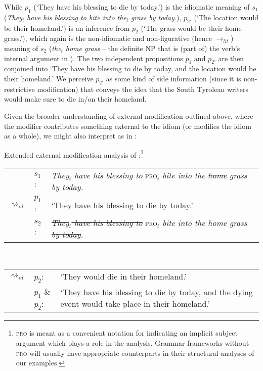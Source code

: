 \documentclass[output=paper]{langsci/langscibook}
\begin{document}
\noindent While $p_{1}$ (`They have his blessing to die by today.') is the idiomatic meaning of $s_{1}$ (\textit{They$_{i}$ have his blessing to bite into the$_{i}$ grass by today.}), $p_{2'}$ (`The location would be their homeland.') is an inference from $p_{2}$ (`The grass would be their home grass.'), which again is the non-idiomatic and non-figurative (hence $\rightarrow_{lit}$) meaning of $s_{2}$ (\textit{the$_{i}$ home grass} -- the definite NP that is (part of) the verb's internal argument in ). The two independent propositions $p_{1}$ and $p_{2'}$ are then conjoined into `They have his blessing to die by today, and the location would be their homeland.' We perceive $p_{2'}$ as some kind of side information (since it is non-restrictive modification) that conveys the idea that the South Tyrolean writers would make sure to die in/on their homeland.

Given the broader understanding of external modification outlined above, \linebreak where the modifier contributes something external to the idiom (or modifies the idiom as a whole), we might also interpret   as in :\largerpage 

\ea \label{analysis2 home grass} 
Extended external modification analysis of :\footnote{\textsc{pro} is meant as a convenient notation for indicating an implicit subject argument which plays a role in the analysis. Grammar frameworks without \textsc{pro} will usually have appropriate counterparts in their structural analyses of our examples.}\smallskip\\
\begin{tabularx}{\linewidth}[t]{@{}llQ@{}}
& 	$s_{1}$: & \textit{They$_{i}$ have his blessing to} \textsc{pro}$_{i}$ \textit{bite into the \sout{home} grass by today.} \\
$\rightsquigarrow_{id}$ &	$p_{1}$: & `They have his blessing to die by today.'\medskip\\
& 	$s_{2}$: & \textit{\sout{They$_{i}$ have his blessing to}} \textsc{pro}$_{i}$ \textit{bite into the home grass \sout{by today}.} \\
\end{tabularx}\\\begin{tabularx}{\linewidth}[t]{@{}llQ@{}}
$\rightsquigarrow_{id}$	&	$p_{2}$: & `They would die in their homeland.'\medskip\\
&	$p_{1}$ \& $p_{2}$: & `They have his blessing to die by today, and the dying event would take place in their homeland.' 
\end{tabularx}
\z
\end{document}
